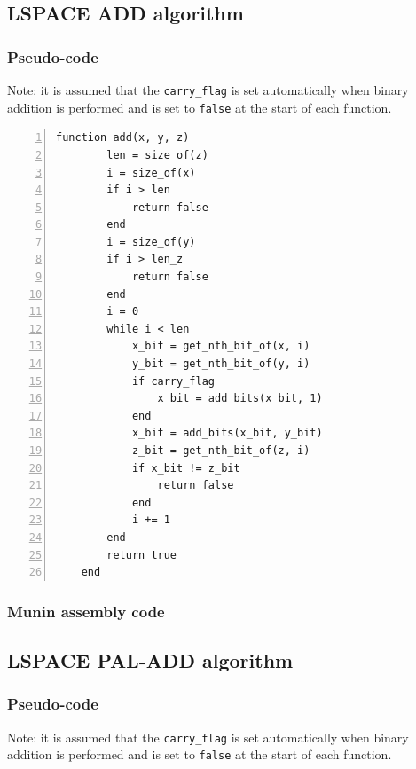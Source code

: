 \documentclass[11pt, a4paper]{article}
\begin{document}


\subsection{LSPACE ADD algorithm}\label{app:lAdd}

\subsubsection{Pseudo-code}

Note: it is assumed that the \lstinline|carry_flag| is set automatically when binary addition is performed and is set to \lstinline|false| at the start of each function.

\begin{lstlisting}[numbers=left]
    function add(x, y, z)
        len = size_of(z)
        i = size_of(x)
        if i > len
            return false
        end
        i = size_of(y)
        if i > len_z
            return false
        end
        i = 0
        while i < len
            x_bit = get_nth_bit_of(x, i)
            y_bit = get_nth_bit_of(y, i)
            if carry_flag
                x_bit = add_bits(x_bit, 1)
            end
            x_bit = add_bits(x_bit, y_bit)
            z_bit = get_nth_bit_of(z, i)
            if x_bit != z_bit
                return false
            end
            i += 1
        end
        return true
    end
\end{lstlisting}

\subsubsection{Munin assembly code}



\subsection{LSPACE PAL-ADD algorithm}\label{app:palAdd}

\subsubsection{Pseudo-code}

Note: it is assumed that the \lstinline|carry_flag| is set automatically when binary addition is performed and is set to \lstinline|false| at the start of each function.
\end{document}

